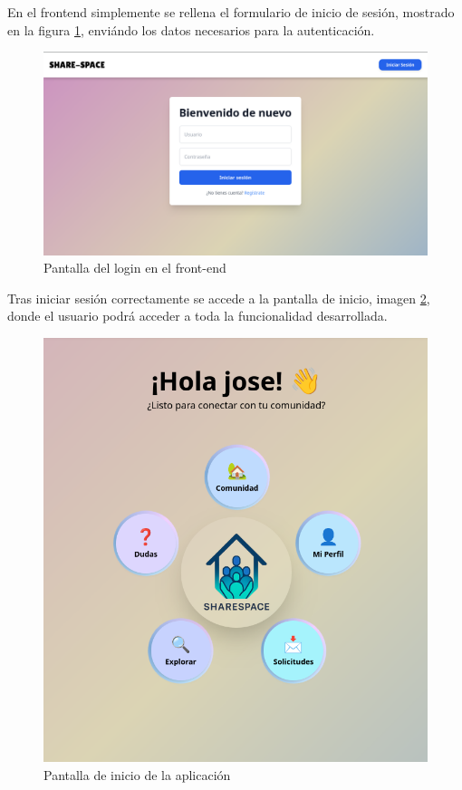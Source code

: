 En el frontend simplemente se rellena el formulario de inicio de sesión, mostrado en la figura \ref{fig:loginFront}, enviándo los datos necesarios para la autenticación.
\begin{figure}[H]
  \centering
  \includegraphics[width=1\textwidth]{fotos/login.png}
  \caption{Pantalla del login en el front-end}
  \label{fig:loginFront}
\end{figure}

Tras iniciar sesión correctamente se accede a la pantalla de inicio, imagen \ref{fig:home}, donde el usuario podrá acceder a toda la funcionalidad desarrollada.
\begin{figure}[H]
  \centering
  \includegraphics[width=1\textwidth]{fotos/menuOpciones-memoria.png}
  \caption{Pantalla de inicio de la aplicación}
  \label{fig:home}
\end{figure}



